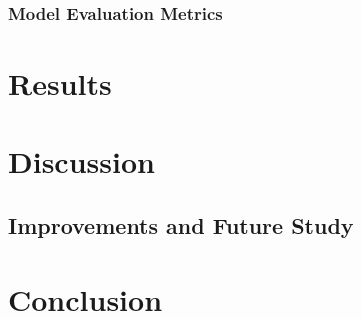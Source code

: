 \documentclass[a4paper,11pt,notitlepage]{article}
\begin{document}
\subsubsection{Model Evaluation Metrics}


\section{Results}


\section{Discussion}


\subsection{Improvements and Future Study}


\section{Conclusion}




\end{document}
